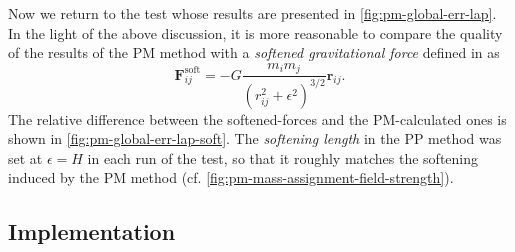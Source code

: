 Now we return to the test whose results are presented in \autoref{fig:pm-global-err-lap}.
In the light of the above discussion, it is more reasonable to compare the quality of the results of the PM method with a \textit{softened gravitational force} defined in \cite{Zhang_2019} as
\begin{equation}\label{eq:softened-force}
    \mathbf{F}^\textrm{soft}_{ij} = -G\frac{m_i m_j}{(r_{ij}^2 + \epsilon^2)^{3/2}}\mathbf{r}_{ij}.
\end{equation}
The relative difference between the softened-forces and the PM-calculated ones is shown in \autoref{fig:pm-global-err-lap-soft}.
The \textit{softening length} in the PP method was set at $\epsilon = H$ in each run of the test, so that it roughly matches the softening induced by the PM method (cf. \autoref{fig:pm-mass-assignment-field-strength}).

\subsection{Implementation}
